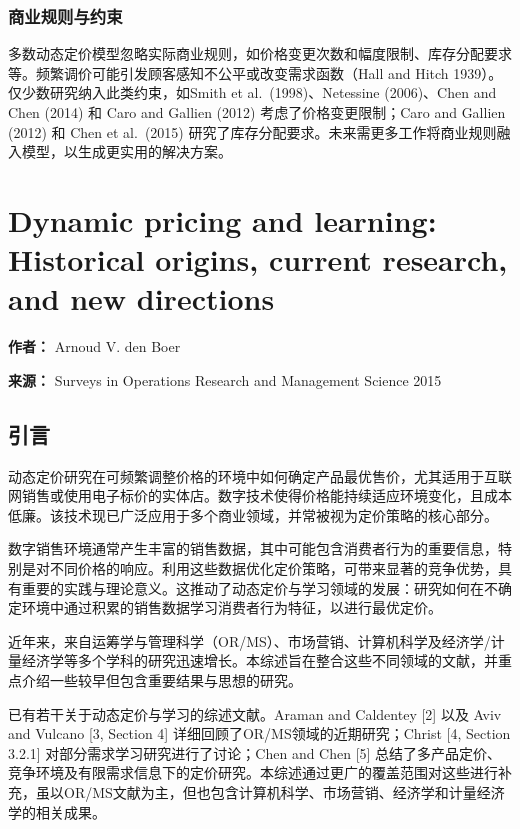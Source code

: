 \subsubsection{商业规则与约束}
多数动态定价模型忽略实际商业规则，如价格变更次数和幅度限制、库存分配要求等。频繁调价可能引发顾客感知不公平或改变需求函数（Hall and Hitch 1939）。仅少数研究纳入此类约束，如Smith et al.~(1998)、Netessine (2006)、Chen and Chen (2014) 和 Caro and Gallien (2012) 考虑了价格变更限制；Caro and Gallien (2012) 和 Chen et al.~(2015) 研究了库存分配要求。未来需更多工作将商业规则融入模型，以生成更实用的解决方案。



\section{Dynamic pricing and learning: Historical origins, current research, and new directions}

\textbf{作者：} Arnoud V. den Boer

\textbf{来源：} Surveys in Operations Research and Management Science 2015



\subsection{引言}\label{introduction}

动态定价研究在可频繁调整价格的环境中如何确定产品最优售价，尤其适用于互联网销售或使用电子标价的实体店。数字技术使得价格能持续适应环境变化，且成本低廉。该技术现已广泛应用于多个商业领域，并常被视为定价策略的核心部分。

数字销售环境通常产生丰富的销售数据，其中可能包含消费者行为的重要信息，特别是对不同价格的响应。利用这些数据优化定价策略，可带来显著的竞争优势，具有重要的实践与理论意义。这推动了动态定价与学习领域的发展：研究如何在不确定环境中通过积累的销售数据学习消费者行为特征，以进行最优定价。

近年来，来自运筹学与管理科学（OR/MS）、市场营销、计算机科学及经济学/计量经济学等多个学科的研究迅速增长。本综述旨在整合这些不同领域的文献，并重点介绍一些较早但包含重要结果与思想的研究。

已有若干关于动态定价与学习的综述文献。Araman and Caldentey [2] 以及 Aviv and Vulcano [3, Section 4] 详细回顾了OR/MS领域的近期研究；Christ [4, Section 3.2.1] 对部分需求学习研究进行了讨论；Chen and Chen [5] 总结了多产品定价、竞争环境及有限需求信息下的定价研究。本综述通过更广的覆盖范围对这些进行补充，虽以OR/MS文献为主，但也包含计算机科学、市场营销、经济学和计量经济学的相关成果。

